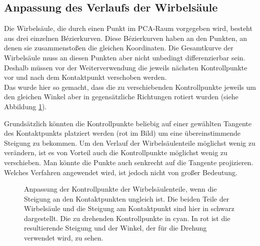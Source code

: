 \subsection{Anpassung des Verlaufs der Wirbelsäule}
\label{section:smooth_spine}

Die Wirbelsäule, die durch einen Punkt im PCA-Raum vorgegeben wird, besteht aus drei einzelnen Bézierkurven. Diese Bézierkurven haben an den Punkten, an denen sie zusammenstoßen die gleichen Koordinaten. Die Gesamtkurve der Wirbelsäule muss an diesen Punkten aber nicht unbedingt differenzierbar sein.
Deshalb müssen vor der Weiterverwendung die jeweils nächsten Kontrollpunkte vor und nach dem Kontaktpunkt verschoben werden. \\
Das wurde hier so gemacht, dass die zu verschiebenden Kontrollpunkte jeweils um den gleichen Winkel aber in gegensätzliche Richtungen rotiert wurden (siehe Abbildung \ref{smooth_spine}). 

Grundsätzlich könnten die Kontrollpunkte beliebig auf einer gewählten Tangente des Kontaktpunkts platziert werden (rot im Bild) um eine übereinstimmende Steigung zu bekommen. Um den Verlauf der Wirbelsäulenteile möglichst wenig zu verändern, ist es von Vorteil auch die Kontrollpunkte möglichst wenig zu verschieben. Man könnte die Punkte \zb auch senkrecht auf die Tangente projizieren. Welches Verfahren angewendet wird, ist jedoch nicht von großer Bedeutung. 

\begin{figure}
 \qquad
 \caption{Anpassung der Kontrollpunkte der Wirbelsäulenteile, wenn die Steigung an den Kontaktpunkten ungleich ist. Die beiden Teile der Wirbelsäule und die Steigung am Kontaktpunkt sind hier in schwarz dargestellt. Die zu drehenden Kontrollpunkte in cyan. In rot ist die resultierende Steigung und der Winkel, der für die Drehung verwendet wird, zu sehen.}
 \label{smooth_spine}
\end{figure}


